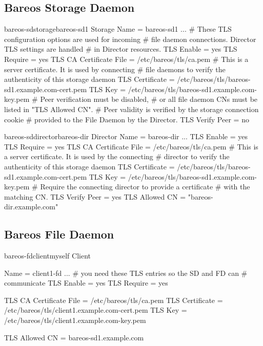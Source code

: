 \subsection{Bareos Storage Daemon}

\begin{bareosConfigResource}{bareos-sd}{storage}{bareos-sd1}
Storage {
    Name = bareos-sd1
    ...
    # These TLS configuration options are used for incoming
    # file daemon connections. Director TLS settings are handled
    # in Director resources.
    TLS Enable = yes
    TLS Require = yes
    TLS CA Certificate File = /etc/bareos/tls/ca.pem
    # This is a server certificate. It is used by connecting
    # file daemons to verify the authenticity of this storage daemon
    TLS Certificate = /etc/bareos/tls/bareos-sd1.example.com-cert.pem
    TLS Key = /etc/bareos/tls/bareos-sd1.example.com-key.pem
    # Peer verification must be disabled,
    # or all file daemon CNs must be listed in "TLS Allowed CN".
    # Peer validity is verified by the storage connection cookie
    # provided to the File Daemon by the Director.
    TLS Verify Peer = no
}
\end{bareosConfigResource}

\begin{bareosConfigResource}{bareos-sd}{director}{bareos-dir}
Director {
    Name = bareos-dir
    ...
    TLS Enable = yes
    TLS Require = yes
    TLS CA Certificate File = /etc/bareos/tls/ca.pem
    # This is a server certificate. It is used by the connecting
    # director to verify the authenticity of this storage daemon
    TLS Certificate = /etc/bareos/tls/bareos-sd1.example.com-cert.pem
    TLS Key = /etc/bareos/tls/bareos-sd1.example.com-key.pem
    # Require the connecting director to provide a certificate
    # with the matching CN.
    TLS Verify Peer = yes
    TLS Allowed CN = "bareos-dir.example.com"
}
\end{bareosConfigResource}



\subsection{Bareos File Daemon}

\begin{bareosConfigResource}{bareos-fd}{client}{myself}
Client {
    Name = client1-fd
    ...
    # you need these TLS entries so the SD and FD can
    # communicate
    TLS Enable = yes
    TLS Require = yes

    TLS CA Certificate File = /etc/bareos/tls/ca.pem
    TLS Certificate = /etc/bareos/tls/client1.example.com-cert.pem
    TLS Key = /etc/bareos/tls/client1.example.com-key.pem

    TLS Allowed CN = bareos-sd1.example.com
}
\end{bareosConfigResource}

